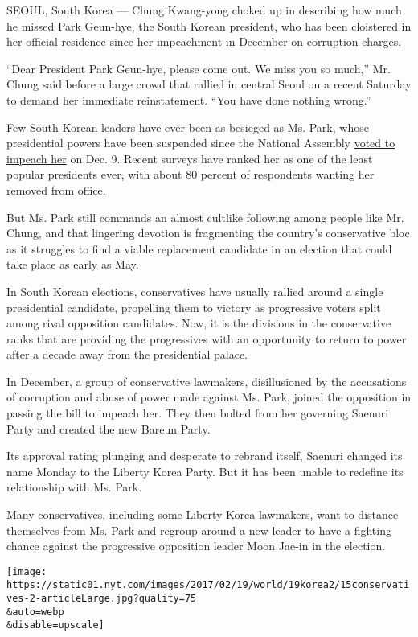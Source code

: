 SEOUL, South Korea --- Chung Kwang-yong choked up in describing how much
he missed Park Geun-hye, the South Korean president, who has been
cloistered in her official residence since her impeachment in December
on corruption charges.

``Dear President Park Geun-hye, please come out. We miss you so much,''
Mr. Chung said before a large crowd that rallied in central Seoul on a
recent Saturday to demand her immediate reinstatement. ``You have done
nothing wrong.''

Few South Korean leaders have ever been as besieged as Ms. Park, whose
presidential powers have been suspended since the National Assembly
\href{https://www.nytimes.com/2016/12/09/world/asia/south-korea-president-park-geun-hye-impeached.html}{voted
to impeach her} on Dec. 9. Recent surveys have ranked her as one of the
least popular presidents ever, with about 80 percent of respondents
wanting her removed from office.

But Ms. Park still commands an almost cultlike following among people
like Mr. Chung, and that lingering devotion is fragmenting the country's
conservative bloc as it struggles to find a viable replacement candidate
in an election that could take place as early as May.

In South Korean elections, conservatives have usually rallied around a
single presidential candidate, propelling them to victory as progressive
voters split among rival opposition candidates. Now, it is the divisions
in the conservative ranks that are providing the progressives with an
opportunity to return to power after a decade away from the presidential
palace.

In December, a group of conservative lawmakers, disillusioned by the
accusations of corruption and abuse of power made against Ms. Park,
joined the opposition in passing the bill to impeach her. They then
bolted from her governing Saenuri Party and created the new Bareun
Party.

Its approval rating plunging and desperate to rebrand itself, Saenuri
changed its name Monday to the Liberty Korea Party. But it has been
unable to redefine its relationship with Ms. Park.

Many conservatives, including some Liberty Korea lawmakers, want to
distance themselves from Ms. Park and regroup around a new leader to
have a fighting chance against the progressive opposition leader Moon
Jae-in in the election.

\texttt{[image: https://static01.nyt.com/images/2017/02/19/world/19korea2/15conservatives-2-articleLarge.jpg?quality=75\\\&auto=webp\\\&disable=upscale]}

